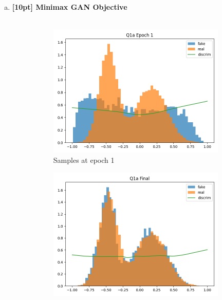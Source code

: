 \documentclass{article}
\begin{document}
\begin{enumerate}[(a)]

\item {\bf [10pt] Minimax GAN Objective} \\\\
\begin{figure}[H]
    \centering
    \begin{subfigure}{0.45\textwidth}
        \centering
        \includegraphics[width=\textwidth]{figures/q1a_epoch1.png}
        \caption{Samples at epoch 1}
    \end{subfigure}
    \begin{subfigure}{0.45\textwidth}
        \centering
        \includegraphics[width=\textwidth]{figures/q1a_final.png}

\end{subfigure}
\end{figure}
\end{enumerate}
\end{document}
